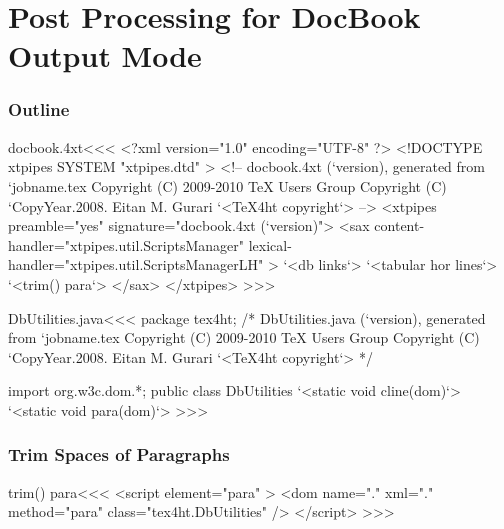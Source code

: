 \documentclass{article}
\begin{document}






\part{Post Processing for DocBook Output Mode}


\section{Outline}



\<docbook.4xt\><<<
<?xml version="1.0" encoding="UTF-8" ?>
<!DOCTYPE xtpipes SYSTEM "xtpipes.dtd" >
<!-- docbook.4xt (`version), generated from `jobname.tex
     Copyright (C) 2009-2010 TeX Users Group
     Copyright (C) `CopyYear.2008. Eitan M. Gurari
`<TeX4ht copyright`> -->
<xtpipes preamble="yes" signature="docbook.4xt (`version)">
   <sax content-handler="xtpipes.util.ScriptsManager" 
        lexical-handler="xtpipes.util.ScriptsManagerLH" >
     `<db links`>
     `<tabular hor lines`>
     `<trim() para`>
   </sax>
</xtpipes>
>>>




\<DbUtilities.java\><<<
package tex4ht;
/* DbUtilities.java (`version), generated from `jobname.tex
   Copyright (C) 2009-2010 TeX Users Group
   Copyright (C) `CopyYear.2008. Eitan M. Gurari
`<TeX4ht copyright`> */

import org.w3c.dom.*;
public class DbUtilities {
  `<static void cline(dom)`>
  `<static void para(dom)`>
}
>>>
 

\section{Trim Spaces of Paragraphs}

\<trim() para\><<<
<script element="para" >
   <dom name="." xml="." method="para" class="tex4ht.DbUtilities" />
</script> 
>>>
\end{document}
